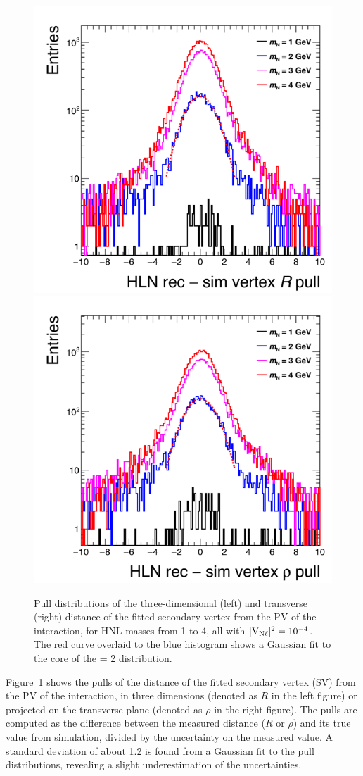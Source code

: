 \begin{figure}[h]
  \centering
  \includegraphics[width=.4\textwidth]{Figures/c6/selection/leptons_fromN_fromNW_vtx_r_pull.png}
  \includegraphics[width=.4\textwidth]{Figures/c6/selection/leptons_fromN_fromNW_vtx_rho_pull.png}
  \caption{Pull distributions of the three-dimensional (left) and
    transverse (right) distance of the fitted secondary vertex from
    the PV of the interaction, for HNL masses from 1 to 4\GeV,
    all with $\mathrm{|V_{\mathrm{N}\ell}|^2}=10^{-4}$. The red curve overlaid to the blue
    histogram shows a Gaussian fit to the core of the \mhnl= 2\GeV
    distribution.}
  \label{fig:svPulls}
\end{figure}

Figure~\ref{fig:svPulls} shows the pulls of the distance of the fitted
secondary vertex (SV) from the PV of the interaction, in three
dimensions (denoted as $R$ in the left figure) or projected on the
transverse plane (denoted as $\rho$ in the right figure). The pulls
are computed as the difference between the measured distance ($R$ or
$\rho$) and its true value from simulation, divided by the uncertainty
on the measured value. A standard deviation of about 1.2 is found from
a Gaussian fit to the pull distributions, revealing a slight
underestimation of the uncertainties.

